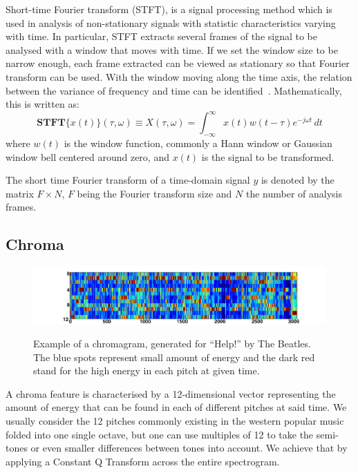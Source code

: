 Short-time Fourier transform (STFT), is a signal processing method which is used in analysis of non-stationary signals with statistic characteristics varying with time.
In particular, STFT extracts several frames of the signal to be analysed with a window that moves with time. If we set the window size to be narrow enough, each frame extracted can be viewed as stationary so that Fourier transform can be used. With the window moving along the time axis, the relation between the variance of frequency and time can be identified~\cite{STFT}.
Mathematically, this is written as:
\begin{equation}
\mathbf{STFT}\{x(t)\}(\tau,\omega) \equiv X(\tau, \omega) = \int_{-\infty}^{\infty} x(t) w(t-\tau) e^{-j \omega t} \, dt 
\end{equation}
where $w(t)$ is the window function, commonly a Hann window or Gaussian window bell centered around zero, and $x(t)$ is the signal to be transformed. 

The short time Fourier transform of a time-domain signal $y$ is denoted by the matrix $F \times N$, $F$ being the Fourier transform size and $N$ the number of analysis frames.

\vspace{10pt}

\subsection{Chroma}

\begin{figure}       
      \centering
                \includegraphics[width=\textwidth]{Figures/chromagram_example}
			   \vspace{15pt}
			   \label{fig:chromaexample}
			   \caption{Example of a chromagram, generated for ``Help!'' by The Beatles. The blue spots represent small amount of energy and the dark red stand for the high energy in each pitch at given time.}
\end{figure}

A chroma feature is characterised by a 12-dimensional vector representing the amount of energy that can be found in each of different pitches at said time. We usually consider the 12 pitches commonly existing in the western popular music folded into one single octave, but one can use multiples of 12 to take the semi-tones or even smaller differences between tones into account. We achieve that by applying a Constant Q Transform across the entire spectrogram. 

